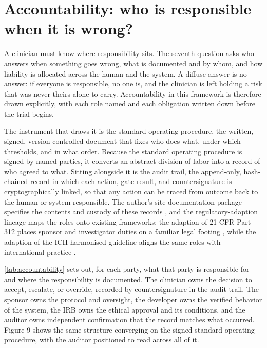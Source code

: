 \section{Accountability: who is responsible when it is wrong?}
\label{sec:accountability}

A clinician must know where responsibility sits. The seventh question asks who
answers when something goes wrong, what is documented and by whom, and how
liability is allocated across the human and the system. A diffuse answer is no
answer: if everyone is responsible, no one is, and the clinician is left holding a
risk that was never theirs alone to carry. Accountability in this framework is
therefore drawn explicitly, with each role named and each obligation written down
before the trial begins.

The instrument that draws it is the standard operating procedure, the written,
signed, version-controlled document that fixes who does what, under which
thresholds, and in what order. Because the standard operating procedure is signed
by named parties, it converts an abstract division of labor into a record of who
agreed to what. Sitting alongside it is the audit trail, the append-only,
hash-chained record in which each action, gate result, and countersignature is
cryptographically linked, so that any action can be traced from outcome back to the
human or system responsible. The author's site documentation package specifies the
contents and custody of these records \cite{Kawchak2026PhysicalAIOncologyClinical},
and the regulatory-adaption lineage maps the roles onto existing frameworks: the
adaption of 21 CFR Part 312 places sponsor and investigator duties on a familiar
legal footing \cite{Kawchak2026Adaption21CFRPart}, while the adaption of the ICH
harmonised guideline aligns the same roles with international practice
\cite{Kawchak2026AdaptionICHHarmonisedGuideline}.

\autoref{tab:accountability} sets out, for each party, what that party is
responsible for and where the responsibility is documented. The clinician owns the
decision to accept, escalate, or override, recorded by countersignature in the
audit trail. The sponsor owns the protocol and oversight, the developer owns the
verified behavior of the system, the IRB owns the ethical approval and its
conditions, and the auditor owns independent confirmation that the record matches
what occurred. Figure 9 shows the same structure converging on the signed standard
operating procedure, with the auditor positioned to read across all of it.

